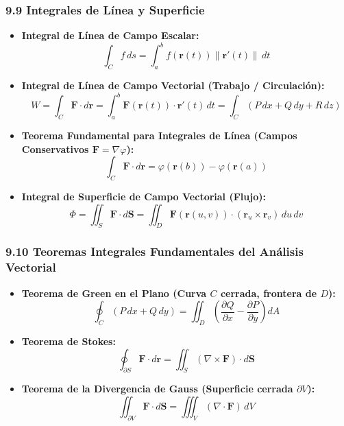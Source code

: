 \documentclass[11pt,a4paper]{article}
\begin{document}
\subsubsection*{9.9 Integrales de Línea y Superficie}

\begin{itemize}
  \item \textbf{Integral de Línea de Campo Escalar:}
  \[
    \int_C f \, ds = \int_a^b f(\mathbf{r}(t)) \|\mathbf{r}'(t)\| \, dt
  \]
  \item \textbf{Integral de Línea de Campo Vectorial (Trabajo / Circulación):}
  \[
    W = \int_C \mathbf{F} \cdot d\mathbf{r} = \int_a^b \mathbf{F}(\mathbf{r}(t)) \cdot \mathbf{r}'(t) \, dt = \int_C (P \, dx + Q \, dy + R \, dz)
  \]
  \item \textbf{Teorema Fundamental para Integrales de Línea (Campos Conservativos $\mathbf{F} = \nabla\varphi$):}
  \[
    \int_C \mathbf{F} \cdot d\mathbf{r} = \varphi(\mathbf{r}(b)) - \varphi(\mathbf{r}(a))
  \]
  \item \textbf{Integral de Superficie de Campo Vectorial (Flujo):}
  \[
    \Phi = \iint_S \mathbf{F} \cdot d\mathbf{S} = \iint_D \mathbf{F}(\mathbf{r}(u, v)) \cdot (\mathbf{r}_u \times \mathbf{r}_v) \, du \, dv
  \]
\end{itemize}

\subsubsection*{9.10 Teoremas Integrales Fundamentales del Análisis Vectorial}

\begin{itemize}
  \item \textbf{Teorema de Green en el Plano (Curva $C$ cerrada, frontera de $D$):}
  \[
    \oint_C (P \, dx + Q \, dy) = \iint_D \left(\frac{\partial Q}{\partial x} - \frac{\partial P}{\partial y}\right) dA
  \]
  \item \textbf{Teorema de Stokes:}
  \[
    \oint_{\partial S} \mathbf{F} \cdot d\mathbf{r} = \iint_S (\nabla \times \mathbf{F}) \cdot d\mathbf{S}
  \]
  \item \textbf{Teorema de la Divergencia de Gauss (Superficie cerrada $\partial V$):}
  \[
    \iint_{\partial V} \mathbf{F} \cdot d\mathbf{S} = \iiint_V (\nabla \cdot \mathbf{F}) \, dV
  \]
\end{itemize}
\end{document}
